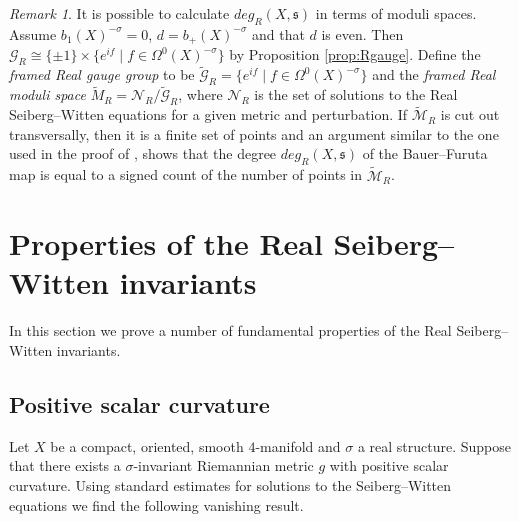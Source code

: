 \documentclass{amsart}
\theoremstyle{definition}
\theoremstyle{remark}
\newtheorem{remark}[theorem]{Remark}
\numberwithin{equation}{section}
\begin{document}
\begin{remark}\label{rem:degcount}
It is possible to calculate $deg_R(X,\mathfrak{s})$ in terms of moduli spaces. Assume $b_1(X)^{-\sigma} = 0$, $d = b_+(X)^{-\sigma}$ and that $d$ is even. Then $\mathcal{G}_R \cong \{ \pm 1\} \times \{ e^{if} \; | \; f \in \Omega^0(X)^{-\sigma} \}$ by Proposition \ref{prop:Rgauge}. Define the {\em framed Real gauge group} to be $\widetilde{\mathcal{G}}_R = \{ e^{if} \; | \; f \in \Omega^0(X)^{-\sigma} \}$ and the {\em framed Real moduli space} $\widetilde{M}_R = \mathcal{N}_R/ \widetilde{\mathcal{G}}_R$, where $\mathcal{N}_R$ is the set of solutions to the Real Seiberg--Witten equations for a given metric and perturbation. If $\widetilde{\mathcal{M}}_R$ is cut out transversally, then it is a finite set of points and an argument similar to the one used in the proof of \cite[Theorem 2.24]{bk}, shows that the degree $deg_R(X , \mathfrak{s})$ of the Bauer--Furuta map is equal to a signed count of the number of points in $\widetilde{\mathcal{M}}_R$.
\end{remark}



\section{Properties of the Real Seiberg--Witten invariants}\label{sec:prop}

In this section we prove a number of fundamental properties of the Real Seiberg--Witten invariants.

\subsection{Positive scalar curvature}\label{sec:psc}

Let $X$ be a compact, oriented, smooth $4$-manifold and $\sigma$ a real structure. Suppose that there exists a $\sigma$-invariant Riemannian metric $g$ with positive scalar curvature. Using standard estimates for solutions to the Seiberg--Witten equations we find the following vanishing result.
\end{document}
